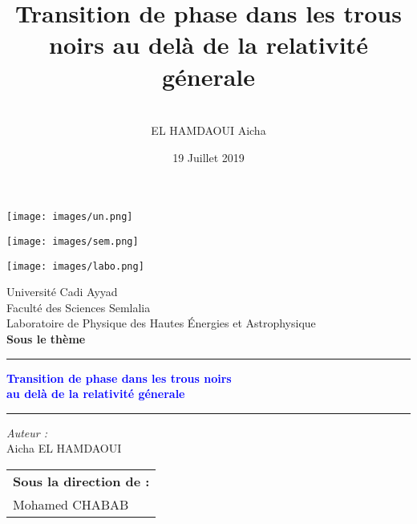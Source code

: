 \documentclass{beamer}
\author{\\EL HAMDAOUI Aicha }
\date{19 Juillet 2019}
\title{Transition de phase dans les trous noirs au delà de la relativité génerale}
\newcommand{\reportauthor}{Aicha \textsc{EL HAMDAOUI}} %
\newcommand{\HRule}{\rule{\linewidth}{0.7mm}}
\begin{document}
\begin{frame}
  \begin{minipage}{0.3\linewidth}
    	\begin{center}
    		\texttt{[image: images/un.png]}\\
    	\end{center}
   \end{minipage}\hfill
   \begin{minipage}{0.3\linewidth}
  	  	\begin{center}
  	  		\texttt{[image: images/sem.png]}\\
  	  	\end{center}
  \end{minipage}\hfill  
  \begin{minipage}{0.3\linewidth}
    	  	\begin{center}
    	  		\texttt{[image: images/labo.png]}\\
    	  	\end{center}
    \end{minipage} 
 	\begin{center}
 	    { Université Cadi Ayyad} \\
 	     Faculté des Sciences Semlalia\\
 	    Laboratoire de Physique des Hautes Énergies et Astrophysique\\
 	    \textbf{Sous le thème}
 	    \end{center}
   
   \HRule
   \begin{center}
     \large  
     	\textcolor{blue}{\textbf{Transition de phase dans les trous noirs }} \\
     	\textcolor{blue}{\textbf{ au delà de la relativité génerale}}
   \end{center}
   \HRule
   \normalsize
   \newline
    \begin{minipage}[b]{0.45\linewidth}
          \begin{flushleft}
          \emph{Auteur :}\\
        \reportauthor
    \end{flushleft}       
       \end{minipage}
        \begin{minipage}[b]{0.45\linewidth}   
          \begin{flushright}
          		\begin{tabular}{l}
          			\textbf{Sous la direction de :} \\
          			       Mohamed \textsc{CHABAB} \\
          			        
          		\end{tabular}
              
    \end{flushright}   
       \end{minipage}
    
\end{frame}
\end{document}
